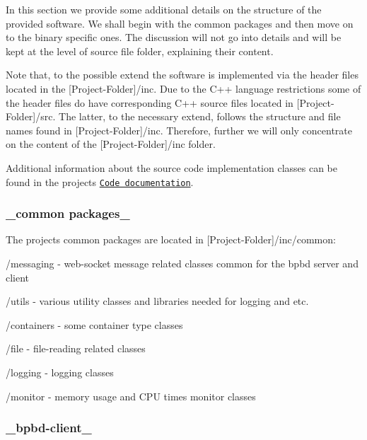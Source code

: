 In this section we provide some additional details on the structure of the provided software. We shall begin with the common packages and then move on to the binary specific ones. The discussion will not go into details and will be kept at the level of source file folder, explaining their content.

Note that, to the possible extend the software is implemented via the header files located in the {\ttfamily \mbox{[}Project-\/\+Folder\mbox{]}/inc}. Due to the C++ language restrictions some of the header files do have corresponding C++ source files located in {\ttfamily \mbox{[}Project-\/\+Folder\mbox{]}/src}. The latter, to the necessary extend, follows the structure and file names found in {\ttfamily \mbox{[}Project-\/\+Folder\mbox{]}/inc}. Therefore, further we will only concentrate on the content of the {\ttfamily \mbox{[}Project-\/\+Folder\mbox{]}/inc} folder.

Additional information about the source code implementation classes can be found in the project\textquotesingle{}s \href{#code-documentation}{\tt Code documentation}.

\subsubsection*{\+\_\+common packages\+\_\+}

The project\textquotesingle{}s common packages are located in {\ttfamily \mbox{[}Project-\/\+Folder\mbox{]}/inc/common}\+:


\begin{DoxyItemize}
\item {\ttfamily /messaging} -\/ web-\/socket message related classes common for the bpbd server and client
\item {\ttfamily /utils} -\/ various utility classes and libraries needed for logging and etc.
\begin{DoxyItemize}
\item {\ttfamily /containers} -\/ some container type classes
\item {\ttfamily /file} -\/ file-\/reading related classes
\item {\ttfamily /logging} -\/ logging classes
\item {\ttfamily /monitor} -\/ memory usage and C\+P\+U times monitor classes
\end{DoxyItemize}
\end{DoxyItemize}

\subsubsection*{\+\_\+bpbd-\/client\+\_\+}

